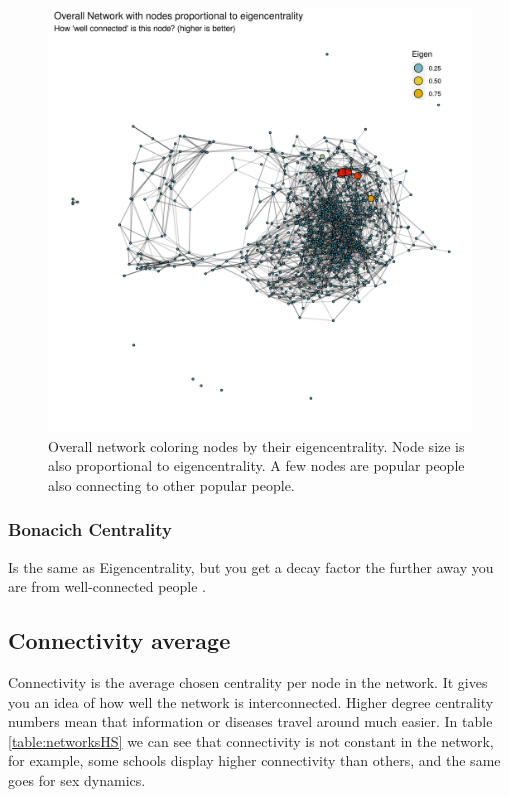     \begin{figure}[h]
        \centering
            \includegraphics[width=0.9\linewidth]{figures/Networks/Centralities/Graph_overallEdgesDF_centralitiesDF_Eigen___mds.png} 
        \caption{Overall network coloring nodes by their eigencentrality. Node size is also proportional to eigencentrality. A few nodes are popular people also connecting to other popular people.}
        \label{figure:networksEigen}
    \end{figure}      

\subsubsection{Bonacich Centrality}
 
Is the same as Eigencentrality, but you get a decay factor the further away you are from well-connected people \cite{Bonacich1972}.

\subsection{Connectivity average}

Connectivity is the average chosen centrality per node in the network. It gives you an idea of how well the network is interconnected. Higher degree centrality numbers mean that information or diseases travel around much easier. In table \ref{table:networksHS} we can see that connectivity is not constant in the network, for example, some schools display higher connectivity than others, and the same goes for sex dynamics.

